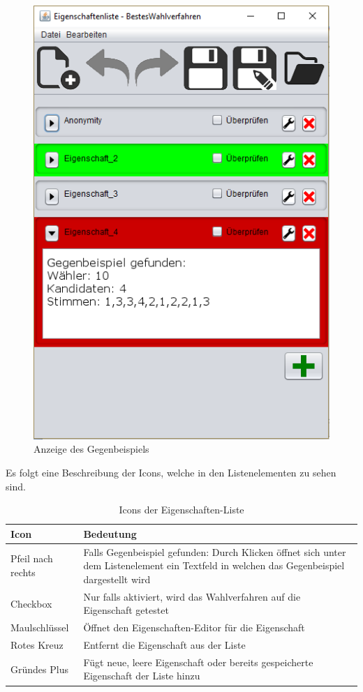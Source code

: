 \documentclass[a4paper]{scrreprt}
\begin{document}
\begin{figure}[H]
\begin{minipage}{.5\textwidth}
  \centering
  \includegraphics[scale=0.5]{gegenbeispiel.png}
  \caption{Anzeige des Gegenbeispiels}
  \label{fig:sub2}
\end{minipage}
\end{figure}

Es folgt eine Beschreibung der Icons, welche in den Listenelementen zu sehen sind.

\begin{table}[H]
\begin{tabular}{|p{3cm}|p{12cm}|}
Icon & Bedeutung \\
\hline
Pfeil nach rechts & Falls Gegenbeispiel gefunden: Durch Klicken öffnet sich unter dem Listenelement ein Textfeld in welchen das Gegenbeispiel dargestellt wird \\
Checkbox & Nur falls aktiviert, wird das Wahlverfahren auf die Eigenschaft getestet \\
Maulschlüssel & Öffnet den Eigenschaften-Editor für die Eigenschaft\\
Rotes Kreuz & Entfernt die Eigenschaft aus der Liste \\
Gründes Plus & Fügt neue, leere Eigenschaft oder bereits gespeicherte Eigenschaft der Liste hinzu
\end{tabular}
\label{Eigenschaftenliste-Bearbeiten-Menüpunkte}
\caption{Icons der Eigenschaften-Liste}
\end{table}
\end{document}
